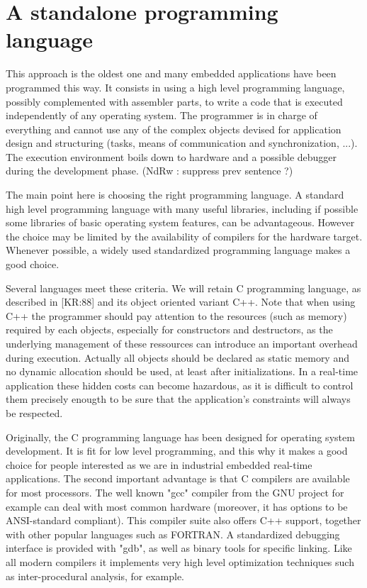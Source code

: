 \documentclass[10pt]{report}
\begin{document}
\section{A standalone programming language}

This approach is the oldest one and many embedded applications 
have been programmed this way. It consists in using a high level 
programming language, possibly complemented with assembler parts, 
to write a code that is executed independently of any operating 
system. The programmer is in charge of everything and cannot use 
any of the complex objects devised for application design and 
structuring (tasks, means of communication and synchronization, 
...). The execution environment boils down to hardware and a 
possible debugger during the development phase. (NdRw : suppress 
prev sentence ?)

The main point here is choosing the right programming language. A 
standard high level programming language with many useful 
libraries, including if possible some libraries of basic 
operating system features, can be advantageous. However the 
choice may be limited by the availability of compilers for the 
hardware target. Whenever possible, a widely used standardized 
programming language makes a good choice.

Several languages meet these criteria. We will retain C 
programming language, as described in [KR:88] and its object 
oriented variant C++. Note that when using C++ the programmer 
should pay attention to the resources (such as memory) required 
by each objects, especially for constructors and destructors, as 
the underlying management of these ressources can introduce an 
important overhead during execution. Actually all objects should 
be declared as static memory and no dynamic allocation should be 
used, at least after initializations. In a real-time application 
these hidden costs can become hazardous, as it is difficult to 
control them precisely enougth to be sure that the application's 
constraints will always be respected.

Originally, the C programming language has been designed for 
operating system development. It is fit for low level 
programming, and this why it makes a good choice for people 
interested as we are in industrial embedded real-time 
applications. The second important advantage is that C compilers 
are available for most processors. The well known "gcc" compiler 
from the GNU project for example can deal with most common 
hardware (moreover, it has options to be ANSI-standard 
compliant). This compiler suite also offers C++ support, together 
with other popular languages such as FORTRAN. A standardized 
debugging interface is provided with "gdb", as well as binary 
tools for specific linking. Like all modern compilers it 
implements very high level optimization techniques such as 
inter-procedural analysis, for example.
\end{document}
